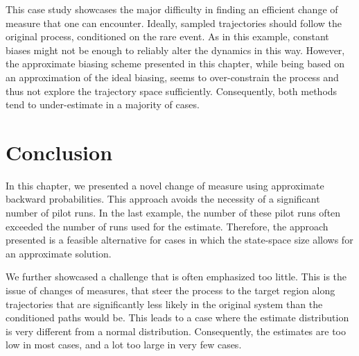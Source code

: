 This case study showcases the major difficulty in finding an efficient change of measure that one can encounter.
Ideally, sampled trajectories should follow the original process, conditioned on the rare event.
As in this example, constant biases might not be enough to reliably alter the dynamics in this way.
However, the approximate biasing scheme presented in this chapter, while being based on an approximation of the ideal biasing, seems to over-constrain the process and thus not explore the trajectory space sufficiently.
Consequently, both methods tend to under-estimate in a majority of cases.

\section{Conclusion}
In this chapter, we presented a novel change of measure using approximate backward probabilities.
This approach avoids the necessity of a significant number of pilot runs.
In the last example, the number of these pilot runs often exceeded the number of runs used for the estimate.
Therefore, the approach presented is a feasible alternative for cases in which the state-space size allows for an approximate solution.

We further showcased a challenge that is often emphasized too little.
This is the issue of changes of measures, that steer the process to the target region along trajectories that are significantly less likely in the original system than the conditioned paths would be.
This leads to a case where the estimate distribution is very different from a normal distribution.
Consequently, the estimates are too low in most cases, and a lot too large in very few cases.

